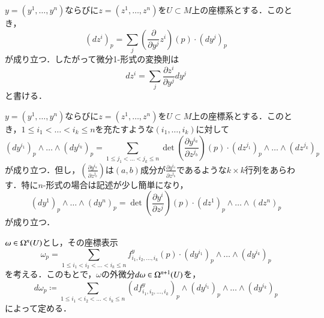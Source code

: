\begin{prop}
$y=(y^1, \dots, y^n)$ならびに$z = (z^1,\dots, z^n)$を$U \subset M$上の座標系とする．このとき，
\begin{equation}
\left(dz^i\right)_p = \sum_{j} \left( \frac{\partial }{\partial y^j} z^i \right) (p) \cdot \left( dy^j \right)_p
\end{equation}が成り立つ．したがって微分1-形式の変換則は
\begin{equation}
dz^i = \sum_{j} \frac{\partial z^i}{\partial y^j} dy^j
\end{equation}と書ける．
\end{prop}

\begin{prop}
$y=(y^1, \dots, y^n)$ならびに$z = (z^1,\dots, z^n)$を$U \subset M$上の座標系とする．このとき，$1 \leq i_1 < \dots < i_k \leq n$を充たすような$(i_1, \dots, i_k)$に対して
\begin{equation}
\left(dy^{i_1} \right)_p \wedge \dots \wedge \left(dy^{i_k} \right)_p = \sum_{1 \leq j_1 < \dots < j_k \leq n} \det \left( \frac{\partial y^{i_a}}{\partial z^{j_b}} \right) (p) \cdot \left( dz^{j_1} \right)_p \wedge \dots \wedge \left( dz^{j_k} \right)_p
\end{equation}が成り立つ．但し，$\left( \frac{\partial y^{i_a}}{\partial z^{j_b}} \right)$は$(a,b)$成分が$\frac{\partial y^{i_a}}{\partial z^{j_b}}$であるような$k \times k$行列をあらわす．特に$n$-形式の場合は記述が少し簡単になり，
\begin{equation}
\left(dy^1 \right)_p \wedge \dots \wedge \left(dy^n \right)_p = \det \left( \frac{\partial y^i}{\partial z^j} \right) (p) \cdot \left( dz^1 \right)_p \wedge \dots \wedge \left( dz^n \right)_p
\end{equation}が成り立つ．
\end{prop}

\begin{defi}$\omega \in \Omega^n(U)$とし，その座標表示
\begin{equation}
\omega_p = \sum_{1 \leq i_1 < i_2 < \dots < i_k \leq n} {f^y_{i_1,i_2,\dots,i_k}}(p) \cdot \left( dy^{i_1} \right)_p \wedge \dots \wedge \left( dy^{i_k} \right)_p
\end{equation}を考える．このもとで，$\omega$の外微分$d \omega \in \Omega^{n+1}(U)$を，
\begin{equation}
d\omega_p \coloneqq \sum_{1 \leq i_1 < i_2 < \dots < i_k \leq n} \left(df^y_{i_1,i_2,\dots,i_k}\right)_p \wedge \left( dy^{i_1} \right)_p \wedge \dots \wedge \left( dy^{i_k} \right)_p
\end{equation}
によって定める．
\end{defi}

